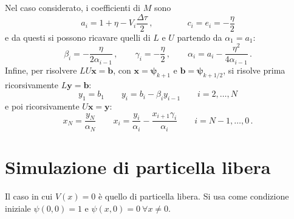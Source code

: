 \documentclass[a4paper, titlepage]{article}
\begin{document}
Nel caso considerato, i coefficienti di $M$ sono
\begin{equation*}
    a_i = 1 + \eta - V_i \frac{\Delta\tau}{2}\, , \qquad\qquad
    c_i = e_i = -\frac{\eta}{2}
\end{equation*}
e da questi si possono ricavare quelli di $L$ e $U$ partendo da $\alpha_1 = a_1$:
\begin{equation*}
    \beta_i = -\frac{\eta}{2\alpha_{i-1}}\, ,
    \qquad
    \gamma_i = -\frac{\eta}{2}\, ,
    \qquad
    \alpha_i = a_i - \frac{\eta^2}{4\alpha_{i-1}}\, .
\end{equation*}
Infine, per risolvere $LU\mathbf{x} = \mathbf{b}$, con $\mathbf{x} = \bm{\psi}_{k+1}$ e $\mathbf{b} = \bm{\psi}_{k+1/2}$, si risolve prima ricorsivamente $L\mathbf{y} = \mathbf{b}$:
\begin{equation*}
    y_1 = b_1 \qquad y_i = b_i -\beta_i y_{i-1} \qquad i = 2,\dots,N
\end{equation*}
e poi ricorsivamente $U\mathbf{x} = \mathbf{y}$:
\begin{equation*}
    x_N = \frac{y_N}{\alpha_N} \qquad x_i = \frac{y_i}{\alpha_i} - \frac{x_{i+1}\gamma_i}{\alpha_i} \qquad i = N-1,\dots,0\, .
\end{equation*}

\section{Simulazione di particella libera}
Il caso in cui $V(x) = 0$ è quello di particella libera. Si usa come condizione iniziale $\psi(0,0) = 1$ e $\psi(x,0) = 0\ \forall x \neq 0$.
\end{document}
